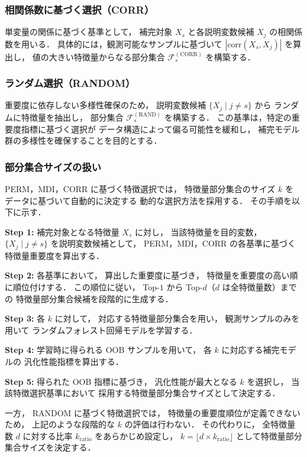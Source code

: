 \subsubsection{相関係数に基づく選択（CORR）}
単変量の関係に基づく基準として，
補完対象 $X_s$ と各説明変数候補 $X_j$ の相関係数を用いる．
具体的には，観測可能なサンプルに基づいて
$|\mathrm{corr}(X_s, X_j)|$ を算出し，
値の大きい特徴量からなる部分集合
$\mathcal{F}_s^{(\mathrm{CORR})}$ を構築する．

\subsubsection{ランダム選択（RANDOM）}
重要度に依存しない多様性確保のため，
説明変数候補 $\{X_j \mid j \neq s\}$ から
ランダムに特徴量を抽出し，
部分集合 $\mathcal{F}_s^{(\mathrm{RAND})}$ を構築する．
この基準は，特定の重要度指標に基づく選択が
データ構造によって偏る可能性を緩和し，
補完モデル群の多様性を確保することを目的とする．

\subsubsection{部分集合サイズの扱い}
PERM，MDI，CORR に基づく特徴選択では，
特徴量部分集合のサイズ $k$ を
データに基づいて自動的に決定する
動的な選択方法を採用する．
その手順を以下に示す．

\noindent
\textbf{Step 1:} 
補完対象となる特徴量 $X_s$ に対し，
当該特徴量を目的変数，
$\{X_j \mid j \neq s\}$ を説明変数候補として，
PERM，MDI，CORR の各基準に基づく
特徴量重要度を算出する．

\noindent
\textbf{Step 2:} 
各基準において，
算出した重要度に基づき，
特徴量を重要度の高い順に順位付けする．
この順位に従い，
Top-$1$ から Top-$d$（$d$ は全特徴量数）までの
特徴量部分集合候補を段階的に生成する．

\noindent
\textbf{Step 3:} 
各 $k$ に対して，
対応する特徴量部分集合を用い，
観測サンプルのみを用いて
ランダムフォレスト回帰モデルを学習する．

\noindent
\textbf{Step 4:} 
学習時に得られる OOB サンプルを用いて，
各 $k$ に対応する補完モデルの
汎化性能指標を算出する．

\noindent
\textbf{Step 5:} 
得られた OOB 指標に基づき，
汎化性能が最大となる $k$ を選択し，
当該特徴選択基準において
採用する特徴量部分集合サイズとして決定する．

一方，
RANDOM に基づく特徴選択では，
特徴量の重要度順位が定義できないため，
上記のような段階的な $k$ の評価は行わない．
その代わりに，
全特徴量数 $d$ に対する比率
$k_{\mathrm{ratio}}$ をあらかじめ設定し，
$k = \lfloor d \times k_{\mathrm{ratio}} \rfloor$
として特徴量部分集合サイズを決定する．

